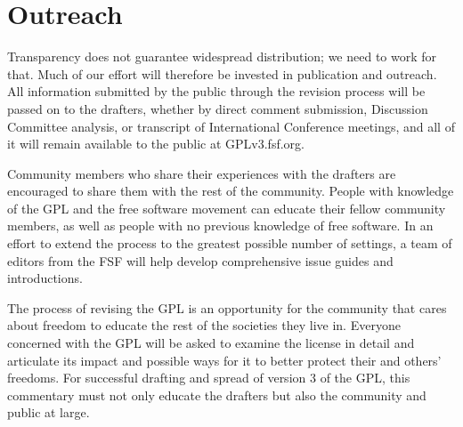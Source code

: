 \section{Outreach}

Transparency does not guarantee widespread distribution; we need to
work for that. Much of our effort will therefore be invested in publication
and outreach. All information submitted by the public through the revision
process will be passed on to the drafters, whether by direct comment
submission, Discussion Committee analysis, or transcript of International
Conference meetings, and all of it will remain available to the public at
GPLv3.fsf.org.

Community members who share their experiences with the drafters are
encouraged to share them with the rest of the community. People with
knowledge of the GPL and the free software movement can educate their
fellow community members, as well as people with no previous knowledge of
free software. In an effort to extend the process to the greatest possible
number of settings, a team of editors from the FSF will help develop
comprehensive issue guides and introductions.

The process of revising the GPL is an opportunity for the community
that cares about freedom to educate the rest of the societies they live in.
Everyone concerned with the GPL will be asked to examine the license
in detail and articulate its impact and possible ways for it to better protect
their and others' freedoms. For successful drafting and spread of version
3 of the GPL, this commentary must not only educate the drafters but also
the community and public at large.
